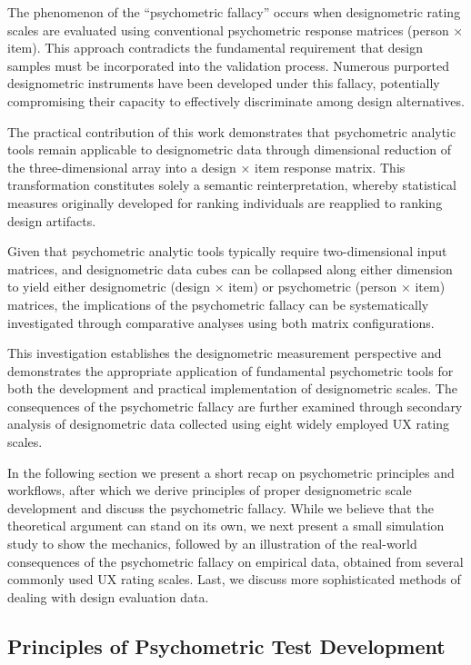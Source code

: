 \documentclass[
  authoryear,
  review]{elsarticle}
\begin{document}
The phenomenon of the ``psychometric fallacy'' occurs when designometric
rating scales are evaluated using conventional psychometric response
matrices (person × item). This approach contradicts the fundamental
requirement that design samples must be incorporated into the validation
process. Numerous purported designometric instruments have been
developed under this fallacy, potentially compromising their capacity to
effectively discriminate among design alternatives.

The practical contribution of this work demonstrates that psychometric
analytic tools remain applicable to designometric data through
dimensional reduction of the three-dimensional array into a design ×
item response matrix. This transformation constitutes solely a semantic
reinterpretation, whereby statistical measures originally developed for
ranking individuals are reapplied to ranking design artifacts.

Given that psychometric analytic tools typically require two-dimensional
input matrices, and designometric data cubes can be collapsed along
either dimension to yield either designometric (design × item) or
psychometric (person × item) matrices, the implications of the
psychometric fallacy can be systematically investigated through
comparative analyses using both matrix configurations.

This investigation establishes the designometric measurement perspective
and demonstrates the appropriate application of fundamental psychometric
tools for both the development and practical implementation of
designometric scales. The consequences of the psychometric fallacy are
further examined through secondary analysis of designometric data
collected using eight widely employed UX rating scales.

In the following section we present a short recap on psychometric
principles and workflows, after which we derive principles of proper
designometric scale development and discuss the psychometric fallacy.
While we believe that the theoretical argument can stand on its own, we
next present a small simulation study to show the mechanics, followed by
an illustration of the real-world consequences of the psychometric
fallacy on empirical data, obtained from several commonly used UX rating
scales. Last, we discuss more sophisticated methods of dealing with
design evaluation data.

\subsection{Principles of Psychometric Test
Development}\label{principles-of-psychometric-test-development}
\end{document}
